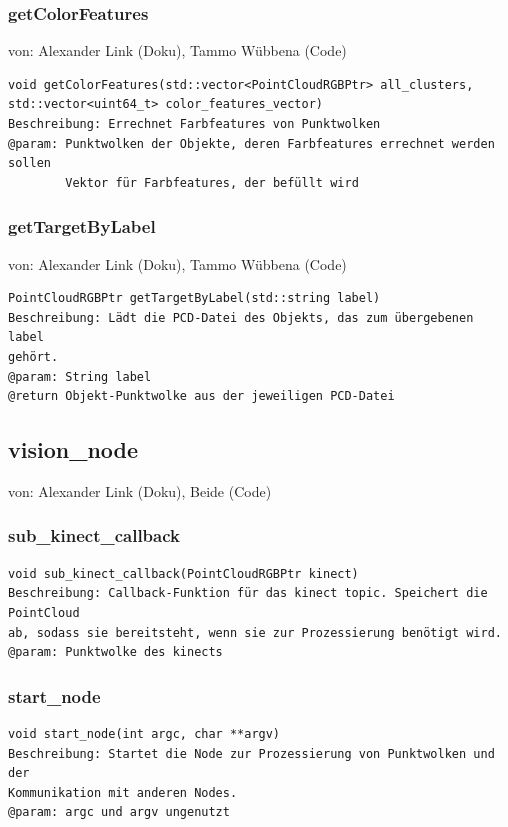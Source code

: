 \documentclass{suturo}
\makeatletter
\newcommand{\chapterauthor}[1]{%
  {\parindent0pt\vspace*{-27pt}%
  \linespread{0}\small\begin{flushright}von: #1\end{flushright}%
  \par\nobreak\vspace*{0pt}}
  \@afterheading%
}
\makeatother
\begin{document}
\subsubsection{getColorFeatures}
\chapterauthor{Alexander Link (Doku), Tammo Wübbena (Code)}
\begin{verbatim}
void getColorFeatures(std::vector<PointCloudRGBPtr> all_clusters,
std::vector<uint64_t> color_features_vector)
Beschreibung: Errechnet Farbfeatures von Punktwolken
@param: Punktwolken der Objekte, deren Farbfeatures errechnet werden sollen
	    Vektor für Farbfeatures, der befüllt wird
\end{verbatim}\label{func:getcolorfeatures}

\subsubsection{getTargetByLabel}
\chapterauthor{Alexander Link (Doku), Tammo Wübbena (Code)}
\begin{verbatim}
PointCloudRGBPtr getTargetByLabel(std::string label)
Beschreibung: Lädt die PCD-Datei des Objekts, das zum übergebenen label
gehört.
@param: String label
@return Objekt-Punktwolke aus der jeweiligen PCD-Datei
\end{verbatim}\label{func:gettargetbylabel}


\subsection*{vision\_node}
\chapterauthor{Alexander Link (Doku), Beide (Code)}
\subsubsection{sub\_kinect\_callback}
\begin{verbatim}
void sub_kinect_callback(PointCloudRGBPtr kinect)
Beschreibung: Callback-Funktion für das kinect topic. Speichert die PointCloud
ab, sodass sie bereitsteht, wenn sie zur Prozessierung benötigt wird.
@param: Punktwolke des kinects
\end{verbatim}\label{func:subkinectcallback}
\subsubsection{start\_node}
\begin{verbatim}
void start_node(int argc, char **argv)
Beschreibung: Startet die Node zur Prozessierung von Punktwolken und der
Kommunikation mit anderen Nodes.
@param: argc und argv ungenutzt
\end{verbatim}\label{func:startnode}
\end{document}
